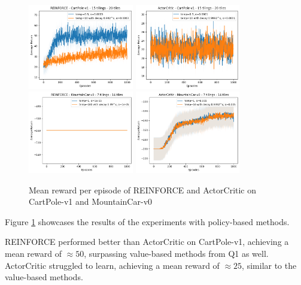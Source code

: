 \documentclass{article}
\begin{document}
\begin{figure}[htbp]
  \centering
  \includegraphics[width=0.41\textwidth]{q2_1.png}
  \includegraphics[width=0.41\textwidth]{q2_2.png}\\
  \includegraphics[width=0.41\textwidth]{q2_3.png}
  \includegraphics[width=0.41\textwidth]{q2_4.png}
  \caption{Mean reward per episode of REINFORCE and ActorCritic on CartPole-v1 and MountainCar-v0}\label{fig:q3}
\end{figure}

Figure \ref{fig:q3} showcases the results of the experiments with policy-based methods.

REINFORCE performed better than ActorCritic on CartPole-v1, achieving a mean reward of $\approx 50$, surpassing
value-based methods from Q1 as well. ActorCritic struggled to learn, achieving a mean reward of $\approx 25$,
similar to the value-based methods.
\end{document}

